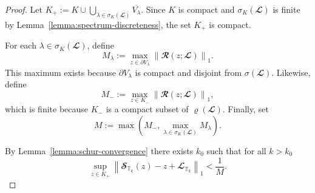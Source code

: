 \documentclass[10pt,a4paper]{amsart}
\newcommand{\LI}{{\mathbb T}}
\begin{document}
\begin{proof}
    Let
        $K_+
        :=
        K \cup \bigcup_{\lambda \in \sigma_K(\mathbfcal L)} \overline{V_\lambda}$.
    Since \(K\) is compact and \(\sigma_K(\mathbfcal L)\) is finite by Lemma~\ref{lemma:spectrum-discreteness}, the set \(K_+\) is compact.

    For each \(\lambda \in \sigma_K(\mathbfcal L)\), define
    \begin{equation}
        M_\lambda
        :=
        \max_{z \in \partial V_\lambda}
        \left \|
        \mathbfcal R(z;\mathbfcal L)
        \right \|_1 .
    \end{equation}
    This maximum exists because \(\partial V_\lambda\) is compact and disjoint from \(\sigma(\mathbfcal L)\). Likewise, define
    \begin{equation}
        M_-
        :=
        \max_{z \in K_-}
        \left \|
        \mathbfcal R(z;\mathbfcal L)
        \right \|_1 ,
    \end{equation}
    which is finite because \(K_-\) is a compact subset of \(\varrho(\mathbfcal L)\). Finally, set
    \begin{equation}
        M := \max\left(M_-, \max_{\lambda \in \sigma_K(\mathbfcal L)} M_\lambda\right).
    \end{equation}

    By Lemma~\ref{lemma:schur-convergence} there exists \(k_0\) such that for all $k > k_0$
    \begin{equation}
        \sup_{z \in K_+}
        \left \|
        \mathbfcal S_{\LI_k}(z) - z + \mathbfcal L_{\LI_k}
        \right \|_1
        <
        \frac{1}{M}.
        \label{eq:small-schur-error}
    \end{equation}


\end{proof}
\end{document}
